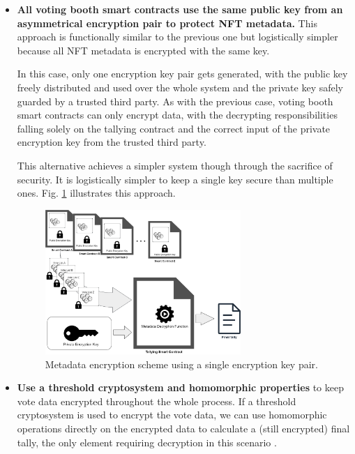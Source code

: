 \documentclass[./4_GeneralApproach.tex]{subfiles}
\begin{document}
\begin{itemize}
    \item{\textbf{All voting booth smart contracts use the same public key from an asymmetrical encryption pair to protect NFT metadata.} This approach is functionally similar to the previous one but logistically simpler because all NFT metadata is encrypted with the same key.
          \par
          In this case, only one encryption key pair gets generated, with the public key freely distributed and used over the whole system and the private key safely guarded by a trusted third party. As with the previous case, voting booth smart contracts can only encrypt data, with the decrypting responsibilities falling solely on the tallying contract and the correct input of the private encryption key from the trusted third party.
          \par
          This alternative achieves a simpler system though through the sacrifice of security. It is logistically simpler to keep a single key secure than multiple ones. Fig. \ref{fig:single_encryption_key_scheme} illustrates this approach.}

          \begin{figure}[htp]
              \centering
              \includegraphics[width=0.7\textwidth]{../Images/ContractBasedSolution_encryption2.png}
              \caption{Metadata encryption scheme using a single encryption key pair.}
              \label{fig:single_encryption_key_scheme}
          \end{figure}

    \item{\textbf{Use a threshold cryptosystem and homomorphic properties} to keep vote data encrypted throughout the whole process. If a threshold cryptosystem is used to encrypt the vote data, we can use homomorphic operations directly on the encrypted data to calculate a (still encrypted) final tally, the only element requiring decryption in this scenario \cite{Benaloh1986b} \cite{Rjaskova2002}.}


\end{itemize}
\end{document}
